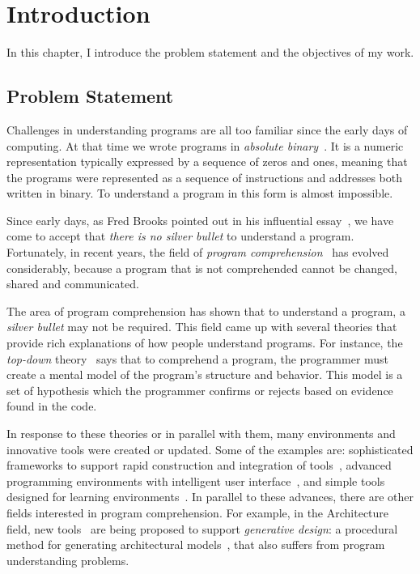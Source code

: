 

\chapter{Introduction}
\label{chapter:introduction}

In this chapter, I introduce the problem statement and the objectives of my work.

\section{Problem Statement}

Challenges in understanding programs are all too familiar since the early days of computing. At that time we wrote programs in \textit{absolute binary}~\citep{hamming2003art}. It is a numeric representation typically expressed by a sequence of zeros and ones, meaning that the programs were represented as a sequence of instructions and addresses both written in binary. To understand a program in this form is almost impossible.

Since early days, as Fred Brooks pointed out in his influential essay~\citep{bullet1987essence}, we have come to accept that \textit{there is no silver bullet} to understand a program. Fortunately, in recent years, the field of \textit{program comprehension}~\citep{rugaber1995program} has evolved considerably, because a program that is not comprehended cannot be changed, shared and communicated.

The area of program comprehension has shown that to understand a program, a \textit{silver bullet} may not be required. This field came up with several theories that provide rich explanations of how people understand programs. For instance, the \textit{top-down} theory~\citep{brooks1977towards} says that to comprehend a program, the programmer must create a mental model of the program's structure and behavior. This model is a set of hypothesis which the programmer confirms or rejects based on evidence found in the code.

In response to these theories or in parallel with them, many environments and innovative tools were created or updated. Some of the examples are: sophisticated frameworks to support rapid construction and integration of tools~\citep{DesRivieres2004}, advanced programming environments with intelligent user interface~\citep{carlson2005eclipse,boudreau2002netbeans,intellij2001intellij,guckenheimer2006software}, and simple tools designed for learning environments~\citep{papert1980mindstorms,Kay1993,Reas2006,findler2002drscheme,GuoSIGCSE2013,mcdirmid2013usable}. In parallel to these advances, there are other fields interested in program comprehension. For example, in the Architecture field, new tools~\citep{aish2012designscript,lopes2011portable} are being proposed to support \textit{generative design}: a procedural method for generating architectural models~\citep{mccormack2004generative}, that also suffers from program understanding problems.

